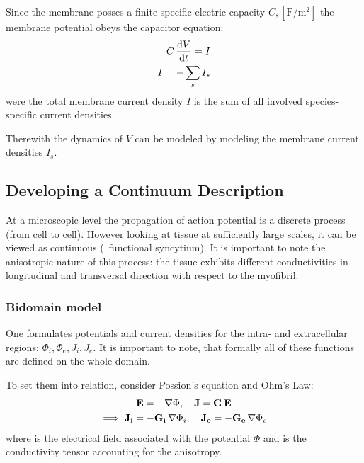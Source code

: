 Since the membrane posses a finite specific electric capacity $C,
[\si{\farad\per\metre\squared}]$
the membrane potential obeys the capacitor equation:
\begin{subequations}
\begin{align}
    C\,\dv{V}{t}=I
    \label{eq:cap} \\
    I=-\sum_{s}I_{s}
    \label{eq:cur}
\end{align}
\end{subequations}
were the total membrane current density $I$ is the sum of all involved
species-specific current densities.
\begin{figure}[h!]
    
\end{figure}
Therewith the dynamics of $V$ can be modeled by modeling the
membrane current densities $I_s$.


\subsection{Developing a Continuum Description}
At a microscopic level the propagation of action potential is a discrete
process (from cell to cell). However looking at tissue at sufficiently
large scales, it can be viewed as continuous (\textrightarrow~functional
syncytium). It is important to note the anisotropic nature of this process:
the tissue exhibits different conductivities in longitudinal and transversal
direction with respect to the myofibril.

\subsubsection{Bidomain model}
One formulates potentials and current densities for the intra- and
extracellular regions: $\Phi_i, \Phi_e, J_i, J_e$.
It is important to note, that formally all of these functions are defined
on the whole domain.

To set them into relation, consider Possion's equation and Ohm's Law:
\begin{gather}
    \mathbf{E}=-\nabla\Phi,\quad \mathbf{J}=\mathbf{G}\,\mathbf{E} \nonumber \\
    \implies \mathbf{J_i}=-\mathbf{G_i}\,\nabla\Phi_i,\quad
    \mathbf{J_e}=-\mathbf{G_e}\,\nabla\Phi_e
\end{gather}
where  is the electrical field associated with the potential $\Phi$
and  is the conductivity tensor accounting for the anisotropy.

